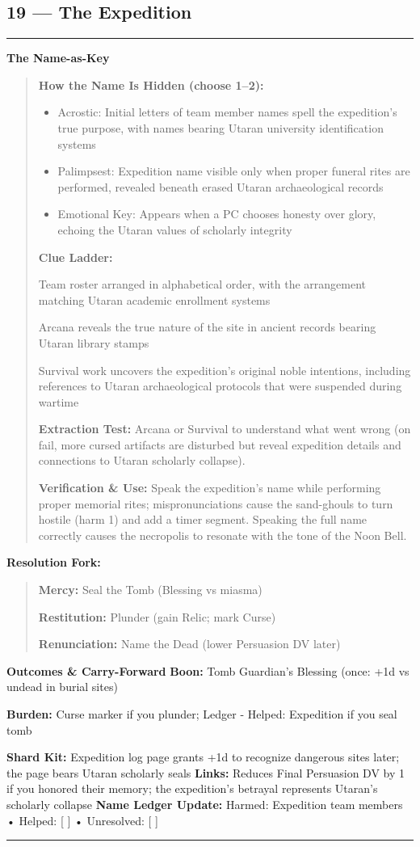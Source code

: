 \documentclass[18pt, letterpaper, twoside]{article}
\newenvironment{floorbox}[1]{%
    \begin{center}
    \begin{minipage}{0.95\textwidth}
    \subsection*{#1}
    \vspace{-0.5em}
    \rule{\textwidth}{0.5pt}
    \vspace{0.5em}
}{%
    \vspace{0.5em}
    \rule{\textwidth}{0.5pt}
    \end{minipage}
    \end{center}
}
\newenvironment{gmnote}[1]{%
    \vspace{0.5em}
    \noindent\textbf{#1}
    \begin{quote}
}{%
    \end{quote}
    \vspace{0.5em}
}
\newenvironment{resolutionbox}{%
    \vspace{0.5em}
    \noindent\textbf{Resolution Fork:}
    \begin{quote}
}{%
    \end{quote}
    \vspace{0.5em}
}
\newcommand{\boon}[1]{\noindent\textbf{Boon:} #1\par}
\newcommand{\burden}[1]{\noindent\textbf{Burden:} #1\par}
\begin{document}
\begin{floorbox}{19 --- The Expedition}
\begin{gmnote}{The Name-as-Key}
\textbf{How the Name Is Hidden (choose 1--2):}
\begin{itemize}[leftmargin=*]
    \item Acrostic: Initial letters of team member names spell the expedition's true purpose, with names bearing Utaran university identification systems
    \item Palimpsest: Expedition name visible only when proper funeral rites are performed, revealed beneath erased Utaran archaeological records
    \item Emotional Key: Appears when a PC chooses honesty over glory, echoing the Utaran values of scholarly integrity
\end{itemize}

\textbf{Clue Ladder:}
\begin{description}[leftmargin=*, style=unboxed]
    \item[Gentle Nudge:] Team roster arranged in alphabetical order, with the arrangement matching Utaran academic enrollment systems
    \item[Actionable Lead:] Arcana reveals the true nature of the site in ancient records bearing Utaran library stamps
    \item[Aha! Proof:] Survival work uncovers the expedition's original noble intentions, including references to Utaran archaeological protocols that were suspended during wartime
\end{description}

\textbf{Extraction Test:} Arcana or Survival to understand what went wrong (on fail, more cursed artifacts are disturbed but reveal expedition details and connections to Utaran scholarly collapse).

\textbf{Verification \& Use:} Speak the expedition's name while performing proper memorial rites; mispronunciations cause the sand-ghouls to turn hostile (harm 1) and add a timer segment. Speaking the full name correctly causes the necropolis to resonate with the tone of the Noon Bell.
\end{gmnote}

\begin{resolutionbox}
\textbf{Mercy:} Seal the Tomb (Blessing vs miasma)

\textbf{Restitution:} Plunder (gain Relic; mark Curse)

\textbf{Renunciation:} Name the Dead (lower Persuasion DV later)
\end{resolutionbox}

\textbf{Outcomes \& Carry-Forward}
\boon{Tomb Guardian's Blessing (once: +1d vs undead in burial sites)}
\burden{Curse marker if you plunder; Ledger - Helped: Expedition if you seal tomb}
\textbf{Shard Kit:} Expedition log page grants +1d to recognize dangerous sites later; the page bears Utaran scholarly seals
\textbf{Links:} Reduces Final Persuasion DV by 1 if you honored their memory; the expedition's betrayal represents Utaran's scholarly collapse
\textbf{Name Ledger Update:} Harmed: Expedition team members • Helped: [ ] • Unresolved: [ ]


\end{floorbox}
\end{document}
